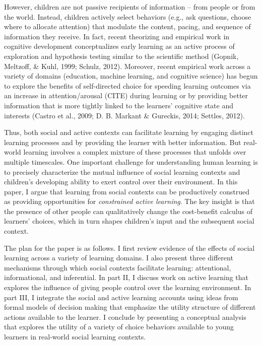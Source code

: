 \documentclass[a4paper,man,apacite,floatsintext]{apa6}
\begin{document}
However, children are not passive recipients of information -- from
people or from the world. Instead, children actively select behaviors
(e.g., ask questions, choose where to allocate attention) that modulate
the content, pacing, and sequence of information they receive. In fact,
recent theorizing and empirical work in cognitive development
conceptualizes early learning as an active process of exploration and
hypothesis testing similar to the scientific method (Gopnik, Meltzoff,
\& Kuhl, 1999; Schulz, 2012). Moreover, recent empirical work across a
variety of domains (education, machine learning, and cognitive science)
has begun to explore the benefits of self-directed choice for speeding
learning outcomes via an increase in attention/arousal (CITE) during
learning or by providing better information that is more tightly linked
to the learners' cognitive state and interests (Castro et al., 2009; D.
B. Markant \& Gureckis, 2014; Settles, 2012).

Thus, both social and active contexts can facilitate learning by
engaging distinct learning processes and by providing the learner with
better information. But real-world learning involves a complex mixture
of these processes that unfolds over multiple timescales. One important
challenge for understanding human learning is to precisely characterize
the mutual influence of social learning contexts and children's
developing ability to exert control over their environment. In this
paper, I argue that learning from social contexts can be productively
construed as providing opportunities for \emph{constrained active
learning}. The key insight is that the presence of other people can
qualitatively change the cost-benefit calculus of learners' choices,
which in turn shapes children's input and the subsequent social context.

The plan for the paper is as follows. I first review evidence of the
effects of social learning across a variety of learning domains. I also
present three different mechanisms through which social contexts
facilitate learning: attentional, informational, and inferential. In
part II, I discuss work on active learning that explores the influence
of giving people control over the learning environment. In part III, I
integrate the social and active learning accounts using ideas from
formal models of decision making that emphasize the utility structure of
different actions available to the learner. I conclude by presenting a
conceptual analysis that explores the utility of a variety of choice
behaviors available to young learners in real-world social learning
contexts.
\end{document}
